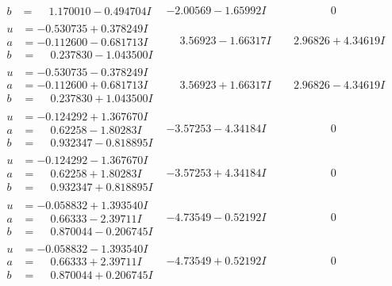 \documentclass[1p]{elsarticle_modified}
\theoremstyle{definition}
\begin{document}
$$\begin{array}{c|c|c}
\begin{aligned}
b &= \phantom{-}1.170010 - 0.494704 I\end{aligned}
 & -2.00569 - 1.65992 I & \phantom{-0.000000 } 0 \\ \hline\begin{aligned}
u &= -0.530735 + 0.378249 I \\
a &= -0.112600 - 0.681713 I \\
b &= \phantom{-}0.237830 - 1.043500 I\end{aligned}
 & \phantom{-}3.56923 - 1.66317 I & \phantom{-}2.96826 + 4.34619 I \\ \hline\begin{aligned}
u &= -0.530735 - 0.378249 I \\
a &= -0.112600 + 0.681713 I \\
b &= \phantom{-}0.237830 + 1.043500 I\end{aligned}
 & \phantom{-}3.56923 + 1.66317 I & \phantom{-}2.96826 - 4.34619 I \\ \hline\begin{aligned}
u &= -0.124292 + 1.367670 I \\
a &= \phantom{-}0.62258 - 1.80283 I \\
b &= \phantom{-}0.932347 - 0.818895 I\end{aligned}
 & -3.57253 - 4.34184 I & \phantom{-0.000000 } 0 \\ \hline\begin{aligned}
u &= -0.124292 - 1.367670 I \\
a &= \phantom{-}0.62258 + 1.80283 I \\
b &= \phantom{-}0.932347 + 0.818895 I\end{aligned}
 & -3.57253 + 4.34184 I & \phantom{-0.000000 } 0 \\ \hline\begin{aligned}
u &= -0.058832 + 1.393540 I \\
a &= \phantom{-}0.66333 - 2.39711 I \\
b &= \phantom{-}0.870044 - 0.206745 I\end{aligned}
 & -4.73549 - 0.52192 I & \phantom{-0.000000 } 0 \\ \hline\begin{aligned}
u &= -0.058832 - 1.393540 I \\
a &= \phantom{-}0.66333 + 2.39711 I \\
b &= \phantom{-}0.870044 + 0.206745 I\end{aligned}
 & -4.73549 + 0.52192 I & \phantom{-0.000000 } 0 \\ \hline\begin{aligned}

\end{aligned}
\end{array}$$
\end{document}
